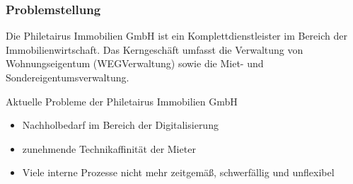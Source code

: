 \begin{frame}
  \frametitle{Problemstellung}

Die Philetairus Immobilien GmbH ist ein Komplettdienstleister im Bereich der
Immobilienwirtschaft. Das Kerngeschäft umfasst die Verwaltung von Wohnungseigentum (WEGVerwaltung) sowie die Miet- und Sondereigentumsverwaltung.\\

  \begin{alertblock}{Aktuelle Probleme der Philetairus Immobilien GmbH}
 	\begin{itemize}
	\item Nachholbedarf im Bereich der Digitalisierung
	 \item zunehmende Technikaffinität der Mieter
	\item Viele interne Prozesse nicht mehr zeitgemäß, schwerfällig und unflexibel
	\end{itemize}
  \end{alertblock}
\end{frame}